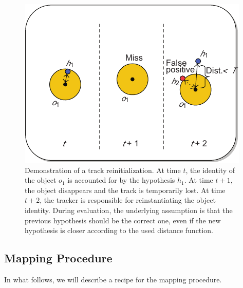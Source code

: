 \begin{figure}[t]
    \centerline{\includegraphics[width=0.5\linewidth]{figures/theoretical_foundations/object_hypothesis_reinit.pdf}}
    \caption[Object-hypothesis re-initialization]{Demonstration of a track reinitialization. At time $t$, the identity of the object $o_1$ is accounted for by the hypothesis $h_1$. At time $t + 1$, the object disappears and the track is temporarily lost. At time $t + 2$, the tracker is responsible for reinstantiating the object identity. During evaluation, the underlying assumption is that the previous hypothesis should be the correct one, even if the new hypothesis is closer according to the used distance function. }
    \label{fig:ObjectHypothesisReInit}
\end{figure}

\subsection{Mapping Procedure}

In what follows, we will describe a recipe for the mapping procedure.

